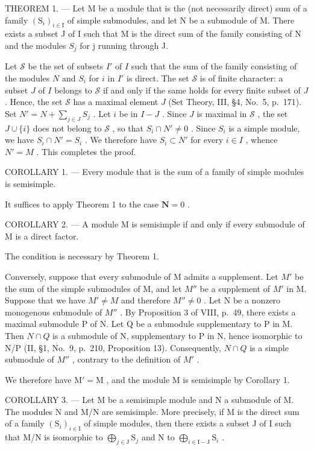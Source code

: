 THEOREM 1. --- Let M be a module that is the (not necessarily direct) sum of a family \((\mathrm{S}_{i})_{i\in\mathrm{I}}\) of simple submodules, and let N be a submodule of M. There exists a subset J of I such that M is the direct sum of the family consisting of N and the modules \(S_{j}\) for j running through J.

Let \(\mathcal{S}\) be the set of subsets \(I'\) of \(I\) such that the sum of the family consisting of the modules \(N\) and \(S_i\) for \(i\) in \(I'\) is direct. The set \(\mathcal{S}\) is of finite character: a subset \(J\) of \(I\) belongs to \(\mathcal{S}\) if and only if the same holds for every finite subset of \(J\) . Hence, the set \(\mathcal{S}\) has a maximal element \(J\) (Set Theory, III, §4, No.~5, p.~171). Set \(N' = N + \sum_{j \in J} S_j\) . Let \(i\) be in \(I - J\) . Since \(J\) is maximal in \(\mathcal{S}\) , the set \(J \cup \{i\}\) does not belong to \(\mathcal{S}\) , so that \(S_i \cap N' \neq 0\) . Since \(S_i\) is a simple module, we have \(S_i \cap N' = S_i\) . We therefore have \(S_i \subset N'\) for every \(i \in I\) , whence \(N' = M\) . This completes the proof.

COROLLARY 1. --- Every module that is the sum of a family of simple modules is semisimple.

It suffices to apply Theorem 1 to the case \(\mathbf{N} = 0\) .

COROLLARY 2. --- A module M is semisimple if and only if every submodule of M is a direct factor.

The condition is necessary by Theorem 1.

Conversely, suppose that every submodule of M admits a supplement. Let \(M'\) be the sum of the simple submodules of M, and let \(M''\) be a supplement of \(M'\) in M. Suppose that we have \(M' \neq M\) and therefore \(M'' \neq 0\) . Let N be a nonzero monogenous submodule of \(M''\) . By Proposition 3 of VIII, p.~49, there exists a maximal submodule P of N. Let Q be a submodule supplementary to P in M. Then \(N \cap Q\) is a submodule of N, supplementary to P in N, hence isomorphic to N/P (II, §1, No.~9, p.~210, Proposition 13). Consequently, \(N \cap Q\) is a simple submodule of \(M''\) , contrary to the definition of \(M'\) .

We therefore have \(\mathrm{M}' = \mathrm{M}\) , and the module \(\mathrm{M}\) is semisimple by Corollary 1.

COROLLARY 3. --- Let M be a semisimple module and N a submodule of M. The modules N and M/N are semisimple. More precisely, if M is the direct sum of a family \((\mathrm{S}_i)_{i\in \mathrm{I}}\) of simple modules, then there exists a subset J of I such that M/N is isomorphic to \(\bigoplus_{j\in \mathrm{J}}\mathrm{S}_j\) and N to \(\bigoplus_{i\in \mathrm{I - J}}\mathrm{S}_i\) .

